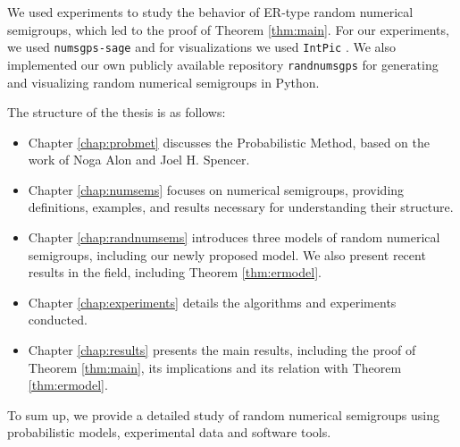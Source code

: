 We used experiments to study the behavior of ER-type random numerical semigroups, which led to the proof of Theorem \ref{thm:main}. For our experiments, we used \verb|numsgps-sage| \cite[O'Neill]{oneill2018}\cite[Delgado]{delgado2015numericalsgps} and for visualizations we used \verb|IntPic| \cite[Delgado]{delgado2013intpic}. We also implemented our own publicly available repository \verb|randnumsgps| \cite{morales2023} for generating and visualizing random numerical semigroups in Python.\par

The structure of the thesis is as follows:

\begin{itemize}
    \item Chapter \ref{chap:probmet} discusses the Probabilistic Method, based on the work of Noga Alon and Joel H. Spencer.
    \item Chapter \ref{chap:numsems} focuses on numerical semigroups, providing definitions, examples, and results necessary for understanding their structure.
    \item Chapter \ref{chap:randnumsems} introduces three models of random numerical semigroups, including our newly proposed model. We also present recent results in the field, including Theorem \ref{thm:ermodel}. 
    \item Chapter \ref{chap:experiments} details the algorithms and experiments conducted.
    \item Chapter \ref{chap:results} presents the main results, including the proof of Theorem \ref{thm:main}, its implications and its relation with Theorem \ref{thm:ermodel}.
\end{itemize}

To sum up, we provide a detailed study of random numerical semigroups using probabilistic models, experimental data and software tools.\par
